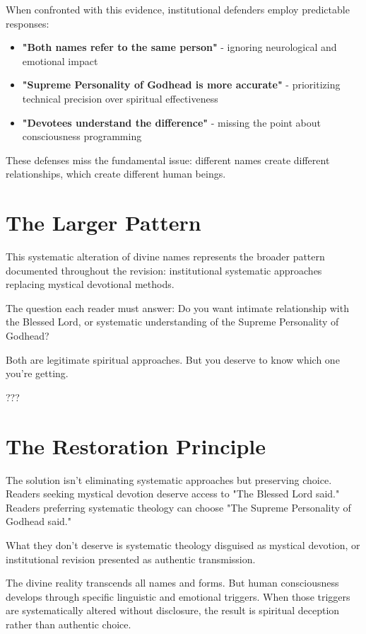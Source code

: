 \documentclass[11pt,twoside]{book}
\begin{document}
When confronted with this evidence, institutional defenders employ predictable responses:

\begin{itemize}
\item \textbf{\textbf{"Both names refer to the same person"}} - ignoring neurological and emotional impact
\item \textbf{\textbf{"Supreme Personality of Godhead is more accurate"}} - prioritizing technical precision over spiritual effectiveness
\item \textbf{\textbf{"Devotees understand the difference"}} - missing the point about consciousness programming
\end{itemize}

These defenses miss the fundamental issue: different names create different relationships, which create different human beings.
\section*{The Larger Pattern}
\label{sec:orgfd03679}

This systematic alteration of divine names represents the broader pattern documented throughout the revision: institutional systematic approaches replacing mystical devotional methods.

The question each reader must answer: Do you want intimate relationship with the Blessed Lord, or systematic understanding of the Supreme Personality of Godhead?

Both are legitimate spiritual approaches. But you deserve to know which one you're getting.


???
\section*{The Restoration Principle}
\label{sec:org32243ea}

The solution isn't eliminating systematic approaches but preserving choice. Readers seeking mystical devotion deserve access to "The Blessed Lord said." Readers preferring systematic theology can choose "The Supreme Personality of Godhead said."

What they don't deserve is systematic theology disguised as mystical devotion, or institutional revision presented as authentic transmission.

The divine reality transcends all names and forms. But human consciousness develops through specific linguistic and emotional triggers. When those triggers are systematically altered without disclosure, the result is spiritual deception rather than authentic choice.
\end{document}
